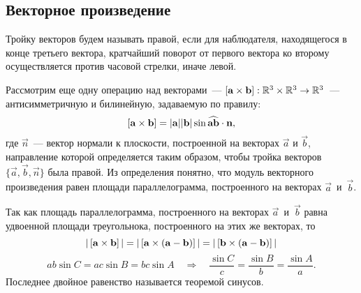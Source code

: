 \subsection{Векторное произведение}
	
	Тройку векторов будем называть правой, если для наблюдателя, находящегося в конце третьего вектора, кратчайший поворот от первого вектора ко второму осуществляется против часовой стрелки, иначе левой.
	
	Рассмотрим еще одну операцию над векторами~---  $\left[\mathbf{a} \times \mathbf{b}\right]: \mathbb{R}^3 \times \mathbb{R}^3 \rightarrow \mathbb{R}^3$~--- антисимметричную и билинейную, задаваемую по правилу:
	\begin{equation}
		\left[\mathbf{a} \times \mathbf{b}\right] = |\mathbf{a}||\mathbf{b}| \sin \widehat{\mathbf{a}\mathbf{b}} \cdot \mathbf{n},
	\end{equation}
	где $\vec{n}$~--- вектор нормали к плоскости, построенной на векторах $\vec{a}$ и $\vec{b}$, направление которой определяется таким образом, чтобы тройка векторов $\{\vec{a}, \vec{b}, \vec{n} \}$ была правой. Из определения понятно, что модуль векторного произведения равен площади параллелограмма, построенного на векторах $\vec{a}$~и~$\vec{b}$.
	
	Так как площадь параллелограмма, построенного на векторах $\vec{a}$~и~$\vec{b}$ равна удвоенной площади треугольнока, построенного на этих же векторах, то
	\begin{equation}
		|\left[\mathbf{a} \times \mathbf{b}\right]| = |\left[\mathbf{a} \times \mathbf{(a - b)}\right] | = |\left[\mathbf{b} \times \mathbf{(a-b)}\right]|
	\end{equation}
	\begin{equation}
		a b \sin C = a c \sin B = b c \sin A \quad \Rightarrow \quad \frac{\sin C}{c} = \frac{\sin B}{b} = \frac{\sin A}{a}. 
	\end{equation}
	Последнее двойное равенство называется теоремой синусов.
	
